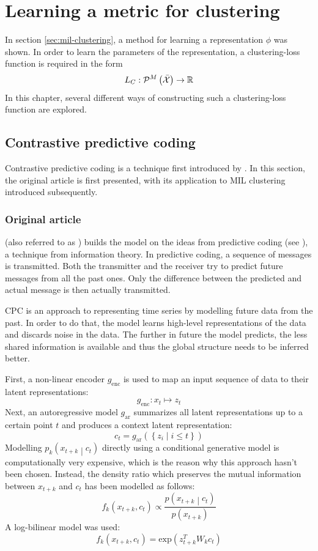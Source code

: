 \chapter{Learning a metric for clustering}\label{chap:clustering-metric}
In section \ref{sec:mil-clustering}, a method for learning a representation \( \phi \) was shown. In order to learn the parameters of the representation, a clustering-loss function is required in the form
\[ L_C : \mathcal{P}^M \left( \bar{\mathcal{X}} \right) \to \mathbb{R} \]
In this chapter, several different ways of constructing such a clustering-loss function are explored.

\section{Contrastive predictive coding}
Contrastive predictive coding is a technique first introduced by \cite{oord_representation_2019}. In this section, the original article is first presented, with its application to MIL clustering introduced subsequently.

\subsection{Original article}
 (also referred to as ) builds the model on the ideas from predictive coding (see \cite{elias_predictive_1955}), a technique from information theory. In predictive coding, a sequence of messages is transmitted. Both the transmitter and the receiver try to predict future messages from all the past ones. Only the difference between the predicted and actual message is then actually transmitted.

CPC is an approach to representing time series by modelling future data from the past. In order to do that, the model learns high-level representations of the data and discards noise in the data. The further in future the model predicts, the less shared information is available and thus the global structure needs to be inferred better.

First, a non-linear encoder \( g_\mathrm{enc} \) is used to map an input sequence of data to their latent representations:
\[ g_\mathrm{enc} : x_t \mapsto z_t \]
Next, an autoregressive model \( g_\mathrm{ar} \) summarizes all latent representations up to a certain point \( t \) and produces a context latent representation:
\[ c_t = g_\mathrm{ar} \left( \left\{ z_i \middle| i \leq t \right\} \right) \]
Modelling \( p_k \left( x_{t + k} \middle| c_t \right) \) directly using a conditional generative model is computationally very expensive, which is the reason why this approach hasn't been chosen. Instead, the density ratio which preserves the mutual information between \( x_{t + k} \) and \( c_t \) has been modelled as follows:
\begin{equation}\label{equa:CPC-model}
  f_k \left( x_{t + k}, c_t \right) \propto \frac{p \left( x_{t + k} \middle| c_t \right)}{p \left( x_{t + k} \right)}
\end{equation}
A log-bilinear model was used:
\[ f_k \left( x_{t + k}, c_t \right) = \mathrm{exp} \left( z_{t + k}^T W_k c_t \right) \]

